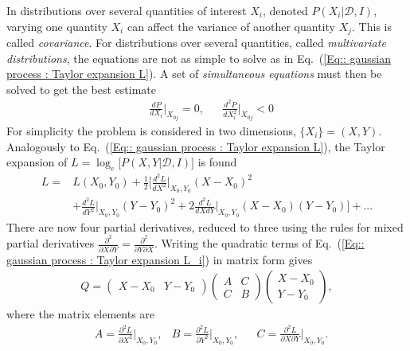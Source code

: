 \documentclass[twoside,english]{uiofysmaster}
\begin{document}
{In distributions over several quantities of interest $X_i$, denoted $P(X_i| \mathcal{D}, I)$, varying one quantity $X_i$ can affect the variance of another quantity $X_j$. This is called \textit{covariance}. For distributions over several quantities, called \textit{multivariate distributions}, the equations are not as simple to solve as in Eq.\ (\ref{Eq:: gaussian process : Taylor expansion L}). A set of \textit{simultaneous equations} must then be solved to get the best estimate
\begin{align}\label{Eq:: gaussian process : Best estimate X_i}
&\frac{dP}{dX_i} \Big|_{X_{0j}} =0, &&\frac{d^2P}{dX_i^2} \Big|_{X_{0j}} < 0
\end{align}
For simplicity the problem is considered in two dimensions, $\{ X_i \}=(X, Y)$. Analogously to Eq.~(\ref{Eq:: gaussian process : Taylor expansion L}), the Taylor expansion of $L = \log_e \Big[ P(X, Y |\mathcal{D}, I) \Big]$ is found
\begin{align}\label{Eq:: gaussian process : Taylor expansion L_i}
L =& L(X_0, Y_0) + \frac{1}{2} \Big[ \frac{d^2L}{dX^2}  \Big|_{X_0, Y_0}(X-X_0)^2 \nonumber \\
& + \frac{d^2L}{dY^2}  \Big|_{X_0, Y_0}(Y-Y_0)^2 + 2 \frac{d^2L}{dXdY}  \Big|_{X_0, Y_0}(X-X_0)(Y-Y_0) \Big] +...
\end{align}
There are now four partial derivatives, reduced to three using the rules for mixed partial derivatives $\frac{\partial^2}{\partial X \partial Y} = \frac{\partial^2}{\partial Y \partial X}$. Writing the quadratic terms of Eq.~(\ref{Eq:: gaussian process : Taylor expansion L_i}) in matrix form gives
\begin{align}
Q = 
\begin{pmatrix}
X-X_0 & Y -Y_0
\end{pmatrix}
\begin{pmatrix}
A & C\\
C & B
\end{pmatrix}
\begin{pmatrix}
X -X_0\\
Y-Y_0
\end{pmatrix},
\end{align}
where the matrix elements are
\begin{align}\label{Eq:: gaussian process : covariance matrix ABC}
&A = \frac{\partial^2 L}{\partial X^2} \Big|_{X_0, Y_0}, &B = \frac{\partial^2 L}{\partial Y^2} \Big|_{X_0, Y_0}, &&C = \frac{\partial^2 L}{\partial X \partial Y} \Big|_{X_0, Y_0}.
\end{align}

}
\end{document}
